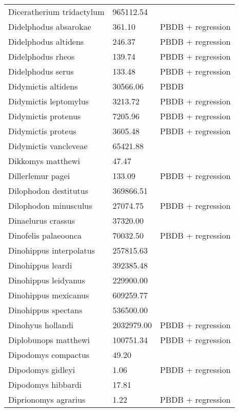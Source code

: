 \documentclass{article}
\begin{document}
\begin{center}
\begin{longtable}{p{} p{} p{}}
    Diceratherium tridactylum & 965112.54 & \cite{Tomiya2013} \\ 
    Didelphodus absarokae & 361.10 & PBDB + regression \\ 
    Didelphodus altidens & 246.37 & PBDB + regression \\ 
    Didelphodus rheos & 139.74 & PBDB + regression \\ 
    Didelphodus serus & 133.48 & PBDB + regression \\ 
    Didymictis altidens & 30566.06 & PBDB \\ 
    Didymictis leptomylus & 3213.72 & PBDB + regression \\ 
    Didymictis protenus & 7205.96 & PBDB + regression \\ 
    Didymictis proteus & 3605.48 & PBDB + regression \\ 
    Didymictis vancleveae & 65421.88 & \cite{Scott2004} \\ 
    Dikkomys matthewi & 47.47 & \cite{Tomiya2013} \\ 
    Dillerlemur pagei & 133.09 & PBDB + regression \\ 
    Dilophodon destitutus & 369866.51 & \cite{Sinclair1915} \\ 
    Dilophodon minusculus & 27074.75 & PBDB + regression \\ 
    Dinaelurus crassus & 37320.00 & \cite{McKenna2011} \\ 
    Dinofelis palaeoonca & 70032.50 & PBDB + regression \\ 
    Dinohippus interpolatus & 257815.63 & \cite{Tomiya2013} \\ 
    Dinohippus leardi & 392385.48 & \cite{Tomiya2013} \\ 
    Dinohippus leidyanus & 229900.00 & \cite{MacFadden1986} \\ 
    Dinohippus mexicanus & 609259.77 & \cite{Tomiya2013} \\ 
    Dinohippus spectans & 536500.00 & \cite{McKenna2011} \\ 
    Dinohyus hollandi & 2032979.00 & PBDB + regression \\ 
    Diplobunops matthewi & 100751.34 & PBDB + regression \\ 
    Dipodomys compactus & 49.20 & \cite{Smith2004} \\ 
    Dipodomys gidleyi & 1.06 & PBDB + regression \\ 
    Dipodomys hibbardi & 17.81 & \cite{Tomiya2013} \\ 
    Diprionomys agrarius & 1.22 & PBDB + regression \\ 

\end{longtable}
\end{center}
\end{document}
